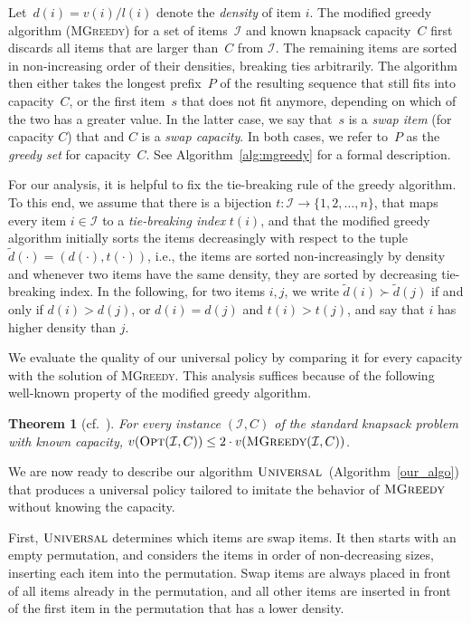 \documentclass[11pt]{article}
\newtheorem{theorem}{Theorem}
\newcommand{\I}{\mathcal{I}}
\begin{document}
Let~$d(i)=v(i)/l(i)$ denote the \emph{density} of item $i$. The
modified greedy algorithm (\textsc{MGreedy}) for a set of items~$\mathcal{I}$
and known knapsack capacity~$C$ first discards all items that are
larger than~$C$ from $\mathcal{I}$. The remaining items are sorted
in non-increasing order of their densities, breaking ties arbitrarily.
The algorithm then either takes the longest prefix~$P$ of the resulting
sequence that still fits into capacity~$C$, or the first item~$s$
that does not fit anymore, depending on which of the two has a greater
value. In the latter case, we say that~$s$ is a \emph{swap item}
(for capacity $C$) that and $C$ is a \emph{swap capacity}. In both
cases, we refer to~$P$ as the \emph{greedy set} for capacity~$C$.
See Algorithm~\ref{alg:mgreedy} for a formal description. 

For our analysis, it is helpful to fix the tie-breaking rule of the
greedy algorithm. To this end, we assume that there is a bijection
$t:\I\to\{1,2,\dots,n\}$, that maps every item $i\in\I$ to a \emph{tie-breaking
index} $t(i)$, and that the modified greedy algorithm initially sorts
the items decreasingly with respect to the tuple $\tilde{d}(\cdot)=(d(\cdot),t(\cdot))$,
i.e., the items are sorted non-increasingly by density and whenever
two items have the same density, they are sorted by decreasing tie-breaking
index. In the following, for two items $i,j$, we write $\tilde{d}(i)\succ\tilde{d}(j)$
if and only if $d(i)>d(j)$, or $d(i)=d(j)$ and $t(i)>t(j)$, and
say that $i$ has higher density than $j$.

We evaluate the quality of our universal policy by comparing it for
every capacity with the solution of \textsc{MGreedy}. This analysis
suffices because of the following well-known property of the modified
greedy algorithm.
\begin{theorem}
[cf.~\cite{korteV02}] For every instance $(\mathcal{I},C)$ of the
standard knapsack problem with known capacity, $v(\textsc{Opt}(\mathcal{I},C))\leq2\cdot v(\textsc{MGreedy}(\mathcal{I},C))$.\label{thm:greedy}

\end{theorem}
We are now ready to describe our algorithm $\textsc{Universal}$~(Algorithm~\ref{our_algo})
that produces a universal policy tailored to imitate the behavior
of $\textsc{MGreedy}$ without knowing the capacity. 

First, $\textsc{Universal}$ determines which items are swap items.
It then starts with an empty permutation, and considers the items
in order of non-decreasing sizes, inserting each item into the permutation.
Swap items are always placed in front of all items already in the
permutation, and all other items are inserted in front of the first
item in the permutation that has a lower density.
\end{document}
